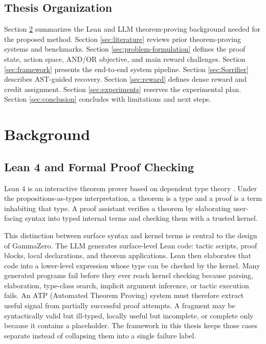 \documentclass[en]{uet_awesome_thesis/uet-awesome-thesis}
\begin{document}
\section{Thesis Organization}

Section \ref{sec:background} summarizes the Lean and LLM theorem-proving background needed for the proposed method. Section \ref{sec:literature} reviews prior theorem-proving systems and benchmarks. Section \ref{sec:problem-formulation} defines the proof state, action space, AND/OR objective, and main reward challenges. Section \ref{sec:framework} presents the end-to-end system pipeline. Section \ref{sec:Sorrifier} describes AST-guided recovery. Section \ref{sec:reward} defines dense reward and credit assignment. Section \ref{sec:experiments} reserves the experimental plan. Section \ref{sec:conclusion} concludes with limitations and next steps.

\chapter{Background}
\label{sec:background}

\section{Lean 4 and Formal Proof Checking}

Lean 4 is an interactive theorem prover based on dependent type theory \citep{demoura2021lean4}. Under the propositions-as-types interpretation, a theorem is a type and a proof is a term inhabiting that type. A proof assistant verifies a theorem by elaborating user-facing syntax into typed internal terms and checking them with a trusted kernel.

This distinction between surface syntax and kernel terms is central to the design of GammaZero. The LLM
generates surface-level Lean code: tactic scripts, proof blocks, local declarations, and theorem
applications. Lean then elaborates that code into a lower-level expression whose type can be checked by
the kernel. Many generated programs fail before they ever reach kernel checking because parsing,
elaboration, type-class search, implicit argument inference, or tactic execution fails. An ATP (Automated Theorem Proving) system must therefore extract useful signal from partially successful proof attempts. A fragment may be syntactically
valid but ill-typed, locally useful but incomplete, or complete only because it contains a placeholder.
The framework in this thesis keeps those cases separate instead of collapsing them into a single failure
label.
\end{document}
